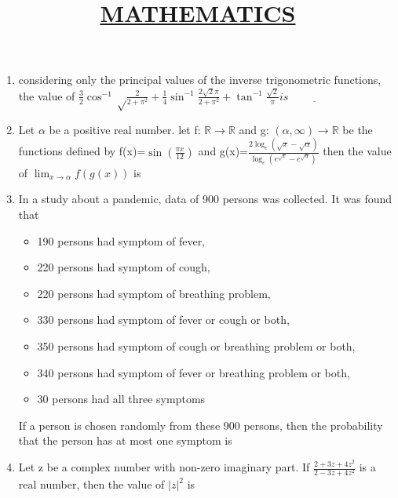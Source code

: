 \documentclass{article}
\title{\underline{\textbf{MATHEMATICS}}}
\date{}
\begin{document}
\maketitle
\begin{enumerate}
	\item considering only the principal values of the inverse trigonometric functions, the value of
		$\frac{3}{2} \cos^{-1} \sqrt\frac{2}{2+\pi^{2}} + \frac{1}{4} \sin^{-1}\frac{2\sqrt{2}\pi}{2+\pi^{2}} + \tan^{-1}\frac{\sqrt{2}}{\pi}is \underline{\hspace{2cm}}$

	\item Let $\alpha$ be a positive real number. let f: $\mathbb{R} \to \mathbb{R}$ and g: $(\alpha, \infty) \to \mathbb{R}$ be the functions defined by 
		f(x)=$\sin(\frac{\pi x}{12})$ and g(x)=$\frac{2\log_e(\sqrt{x}-\sqrt{\alpha})}{\log_e(e^{\sqrt{x}}-e^{\sqrt{\alpha}})}$
then the value of $\lim_{x \to \alpha}f(g(x))$ is 
\underline{\hspace{2cm}}
	
	\item In a study about a pandemic, data of 900 persons was collected. It was found that\\ 
\begin{itemize}
  \item 190 persons had symptom of fever, 
  \item 220 persons had symptom of cough, 
  \item	220 persons had symptom of breathing problem, 
  \item	330 persons had symptom of fever or cough or both,
  \item	350 persons had symptom of cough or breathing problem or both, 
  \item 340 persons had symptom of fever or breathing problem or both, 
  \item	30 persons had all three symptoms 
\end{itemize}

	If a person is chosen randomly from these 900 persons, then the probability that the person has at 
most one symptom is      \underline{\hspace{2cm}}

	\item Let z be a complex number with non-zero imaginary part.
		If    $\frac{2+3z+4z^2}{2-3z+4z^2}$
		is a real number, then the value of $|z|^2$ is \underline{\hspace{2cm}}


\end{enumerate}
\end{document}
